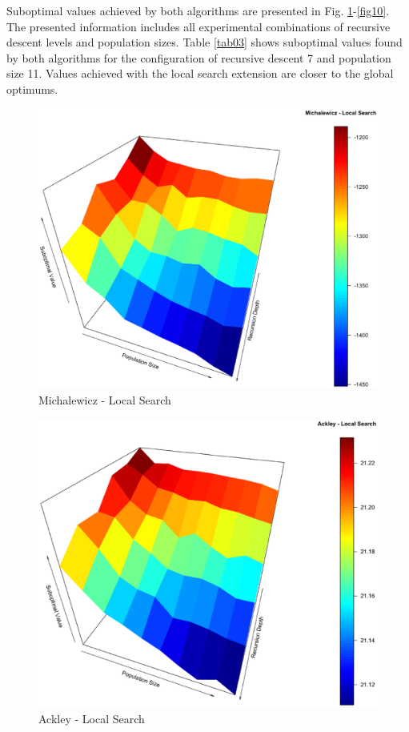 \documentclass[conference]{IEEEtran}
\begin{document}
Suboptimal values achieved by both algorithms are presented in Fig. \ref{fig01}-\ref{fig10}. The presented information includes all experimental combinations of recursive descent levels and population sizes. Table \ref{tab03} shows suboptimal values found by both algorithms for the configuration of recursive descent 7 and population size 11. Values achieved with the local search extension are closer to the global optimums.

\begin{figure}[tbp]
\centering
\includegraphics[width=1.0\hsize]{fig03.eps}
\caption{Michalewicz - Local Search}
\label{fig01}
\end{figure}

\begin{figure}[tbp]
\centering
\includegraphics[width=1.0\hsize]{fig06.eps}
\caption{Ackley - Local Search}
\label{fig02}
\end{figure}
\end{document}
